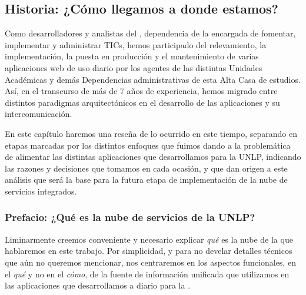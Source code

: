 \subsection{Historia: ¿Cómo llegamos a donde estamos?}
\label{nube:historia}

Como desarrolladores y analistas del \cespi, dependencia de la \unlp encargada de fomentar, implementar y administrar TICs, hemos participado del relevamiento, la implementación, la puesta en producción y el mantenimiento de varias aplicaciones web de uso diario por los agentes de las distintas Unidades Académicas y demás Dependencias administrativas de esta Alta Casa de estudios. Así, en el transcurso de más de 7 años de experiencia, hemos migrado entre distintos paradigmas arquitectónicos en el desarrollo de las aplicaciones y su intercomunicación.

En este capítulo haremos una reseña de lo ocurrido en este tiempo, separando en etapas marcadas por los distintos enfoques que fuimos dando a la problemática de alimentar las distintas aplicaciones que desarrollamos para la UNLP, indicando las razones y decisiones que tomamos en cada ocasión, y que dan origen a este análisis que será la base para la futura etapa de implementación de la nube de servicios integrados.


\subsubsection{Prefacio: ¿Qué es la nube de servicios de la UNLP?}
\label{nube:prefacio}

Liminarmente creemos conveniente y necesario explicar \textit{qué} es la nube de la que hablaremos en este trabajo. Por simplicidad, y para no develar detalles técnicos que aún no queremos mencionar, nos centraremos en los aspectos funcionales, en el \textit{qué} y no en el \textit{cómo}, de la fuente de información unificada que utilizamos en las aplicaciones que desarrollamos a diario para la \unlp.

